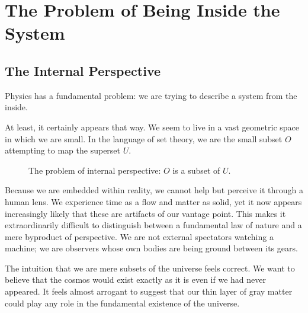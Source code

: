 \chapter{The Problem of Being Inside the System}
\label{chap:problem-of-being-inside}

\section{The Internal Perspective}

Physics has a fundamental problem: we are trying to describe a system from the inside.

At least, it certainly appears that way.
We seem to live in a vast geometric space in which we are small.
In the language of set theory, we are the small subset $O$ attempting to map the superset $U$.

\begin{figure}[h]
    \centering
    \caption{The problem of internal perspective: $O$ is a subset of $U$.}
\end{figure}

Because we are embedded within reality, we cannot help but perceive it through a human lens.
We experience time as a flow and matter as solid, yet it now appears increasingly likely that these are artifacts of our vantage point.
This makes it extraordinarily difficult to distinguish between a fundamental law of nature and a mere byproduct of perspective.
We are not external spectators watching a machine; we are observers whose own bodies are being ground between its gears.

The intuition that we are mere subsets of the universe feels correct.
We want to believe that the cosmos would exist exactly as it is even if we had never appeared.
It feels almost arrogant to suggest that our thin layer of gray matter could play any role in the fundamental existence of the universe.

